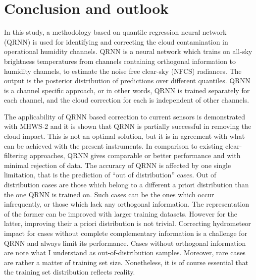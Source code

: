 \documentclass[amt, manuscript]{copernicus}
\newcommand{\todo}[1]{{\color{red} #1}}
\begin{document}
\section{Conclusion and outlook}  %
\label{conclusions}
%

In this study, a methodology based on quantile regression neural network (QRNN) is used for identifying and correcting the cloud contamination in operational humidity channels. QRNN is a neural network which trains on all-sky brightness temperatures from  channels containing orthogonal information to humidity channels, to estimate the noise free clear-sky (NFCS) radiances. The output is the posterior distribution of predictions over different quantiles. QRNN is a channel specific approach, or in other words, QRNN is trained separately for each channel, and the cloud correction for each is independent of other channels. 
 
The applicability of QRNN based correction to current sensors is demonstrated with MHWS-2 and it is shown that QRNN is partially successful in removing the cloud impact. This is not  an optimal solution, but it is in agreement with what can be achieved with the present instruments. In comparison to existing clear-filtering approaches, QRNN gives comparable or better performance and with minimal rejection of data. The accuracy of QRNN is affected by one single limitation, that is the prediction of ``out of distribution'' cases. Out of distribution cases are those which belong to a different a priori distribution than the one QRNN is trained on. Such cases can be the ones which occur infrequently, or those which lack any orthogonal information. The representation of the former can be improved with larger training datasets. However for the latter, improving their a priori distribution is not trivial. Correcting hydrometeor impact for cases without complete complementary information is a challenge for QRNN and always limit its performance. \todo{Cases without orthogonal information are note what I understand as out-of-distribution samples. Moreover, rare cases are rather a matter of training set size. Nonetheless, it is of course essential that
  the training set distribution reflects reality.}
\end{document}
